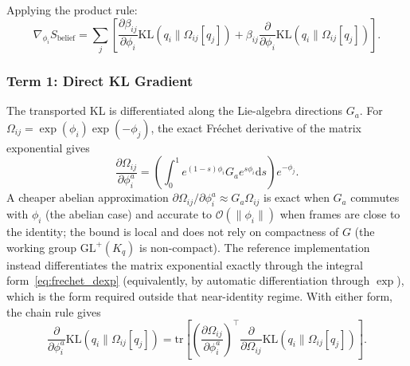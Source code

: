 \documentclass[11pt]{article}
\begin{document}
Applying the product rule:
\begin{equation}
\nabla_{\phi_i} S_{\mathrm{belief}} = \sum_j \left[ \frac{\partial \beta_{ij}}{\partial \phi_i} \mathrm{KL}(q_i \| \Omega_{ij}[q_j]) + \beta_{ij} \frac{\partial}{\partial \phi_i}\mathrm{KL}(q_i \| \Omega_{ij}[q_j]) \right].
\end{equation}

\subsubsection*{Term 1: Direct KL Gradient}

The transported KL is differentiated along the Lie-algebra directions $G_a$. For $\Omega_{ij} = \exp(\phi_i)\exp(-\phi_j)$, the exact Fr\'echet derivative of the matrix exponential gives
\begin{equation}
\frac{\partial \Omega_{ij}}{\partial \phi_i^a} = \left(\int_0^1 e^{(1-s)\phi_i} G_a e^{s\phi_i} \mathrm{d}s\right) e^{-\phi_j}.
\label{eq:frechet_dexp}
\end{equation}
A cheaper abelian approximation $\partial \Omega_{ij}/\partial \phi_i^a \approx G_a \Omega_{ij}$ is exact when $G_a$ commutes with $\phi_i$ (the abelian case) and accurate to $\mathcal{O}(\|\phi_i\|)$ when frames are close to the identity; the bound is local and does not rely on compactness of $G$ (the working group $\mathrm{GL}^+(K_q)$ is non-compact). The reference implementation instead differentiates the matrix exponential exactly through the integral form~\eqref{eq:frechet_dexp} (equivalently, by automatic differentiation through $\exp$), which is the form required outside that near-identity regime. With either form, the chain rule gives
\begin{equation}
\frac{\partial}{\partial \phi_i^a}\mathrm{KL}(q_i \| \Omega_{ij}[q_j]) = \mathrm{tr}\left[\left(\frac{\partial \Omega_{ij}}{\partial \phi_i^a}\right)^\top \frac{\partial}{\partial \Omega_{ij}}\mathrm{KL}(q_i \| \Omega_{ij}[q_j])\right].
\end{equation}
\end{document}
